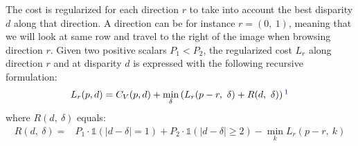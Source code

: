 The cost is regularized for each direction $r$ to take into account the best disparity $d$ along that direction. A direction can be for instance $r=(0,~1)$, meaning that we will look at same row and travel to the right of the image when browsing direction $r$. Given two positive scalars $P_1<P_2$, the regularized cost $L_r$ along direction $r$ and at disparity $d$ is expressed with the following recursive formulation:
\begin{align}\label{eq:sgm}
    L_r(p,d) = C_V(p,d) + \min_\delta \left(L_r(p-r,~\delta) + R(d, ~\delta)\right)\commanue{elle est bizarre la formulation de SGM. Je comprends le $\delta$, c'est pas évident de retrouver la formule de l'article}
\end{align}
where $R(d, ~\delta)$ equals:
\begin{align}
    R(d, ~\delta) = &P_1\cdot\mathds{1}(|d-\delta|=1) + P_2\cdot\mathds{1}(|d-\delta|\geqslant 2) - \min_k L_r(p-r,~k) \label{eq:sgm_penalties}
\end{align}
